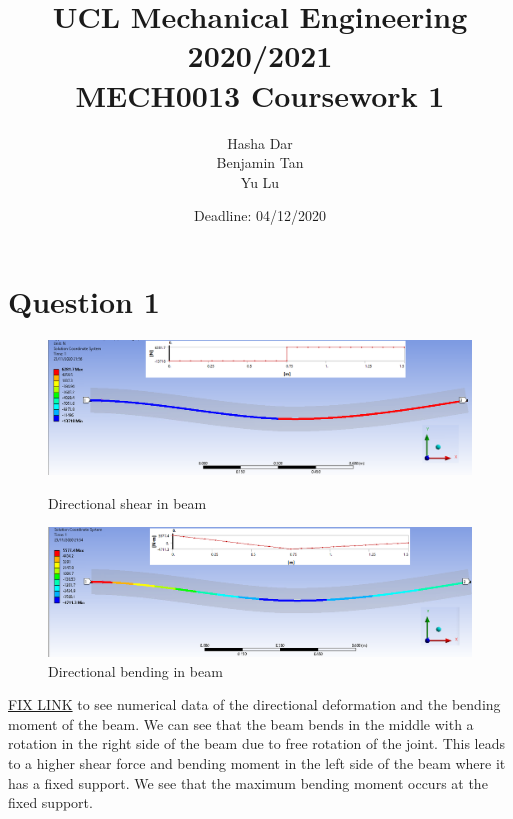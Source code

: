 \documentclass[11pt]{article}
\numberwithin{equation}{section}
\begin{document}
\title{\textbf{UCL Mechanical Engineering 2020/2021}\\MECH0013 Coursework 1}
\date{Deadline: 04/12/2020}
\author{Hasha Dar\\
Benjamin Tan\\
Yu Lu}
\maketitle
\tableofcontents
\newpage
\section{Question 1}
\begin{figure}[H]
  \centering
  \begin{minipage}[b]{0.49\textwidth}
    \includegraphics[width=\textwidth]{./img/DirectionalShearQ1.png}
    \caption{Directional shear in beam}
  \end{minipage}
  \hfill
  \begin{minipage}[b]{0.49\textwidth}
    \includegraphics[width=\textwidth]{./img/DirectionalBendingQ1.png}
    \caption{Directional bending in beam}
  \end{minipage}
\end{figure}
\href{https://github.com/hashadar/ME-Latex/tree/master/MECH0013/Topic%20Notes}{FIX LINK} to see numerical data of the directional deformation and the bending moment of the beam. We can see that the beam bends in the middle with a rotation in the right side of the beam due to free rotation of the joint. This leads to a higher shear force and bending moment in the left side of the beam where it has a fixed support. We see that the maximum bending moment occurs at the fixed support. 
\end{document}
